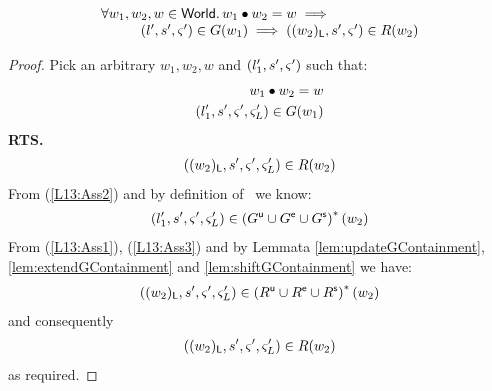 %
%
\begin{lemma}[] \label{lem:guaranteeContainment}
%
\[
\begin{array}{l}
	\forall w_1, w_2, w \in \textsf{World}.\, w_1 \bullet w_2 = w \implies\\
	\hspace*{1cm}(l', s', \varsigma_{}') \in G(w_1) \implies ((w_2)_{\textsf{L}}, s', \varsigma_{}') \in R(w_2)
\end{array}
\]
%
\begin{proof} Pick an arbitrary $w_1, w_2, w$ and $(l'_1, s', \varsigma_{}')$ such that:
%
\begin{align}
	w_1 \bullet w_2 = w \label{L13:Ass1}\\
	(l'_1, s', \varsigma_{}', \varsigma_{L}') \in G(w_1) \label{L13:Ass2}
\end{align}
%
\textbf{RTS.}
%
\begin{align}
	((w_2)_{\textsf{L}}, s', \varsigma_{}', \varsigma_{L}') \in R(w_2) \label{L13:Goal}
\end{align}
From (\ref{L13:Ass2}) and by definition of \guarantee\ we know:
%
\begin{align}
	(l'_1, s', \varsigma_{}', \varsigma_{L}') \in \left(G^{\textsf{u}} \cup G^{\textsf{e}} \cup G^{\textsf{s}} \right)^{*}(w_2) \label{L13:Ass3}
\end{align}
%
From (\ref{L13:Ass1}), (\ref{L13:Ass3}) and by Lemmata \ref{lem:updateGContainment}, \ref{lem:extendGContainment} and \ref{lem:shiftGContainment} we have:
%
\begin{align}
	((w_2)_{\textsf{L}}, s', \varsigma_{}', \varsigma_{L}') \in \left(R^{\textsf{u}} \cup R^{\textsf{e}} \cup R^{\textsf{s}} \right)^{*}(w_2) \nonumber
\end{align}
%
and consequently 
%
\begin{align}
	((w_2)_{\textsf{L}}, s', \varsigma_{}', \varsigma_{L}') \in R(w_2) \nonumber
\end{align}
%
as required.
\end{proof}
\end{lemma}
